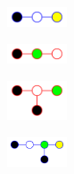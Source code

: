 \vspace{-10pt}
\begin{minipage}[t]{0.24\hsize}
	\centering
	\includegraphics[width=50pt]{graph/g03b.png} \\
	\n
\end{minipage}
\begin{minipage}[t]{0.24\hsize}
	\centering
	\includegraphics[width=50pt]{graph/g01r.png} \\
	\p
\end{minipage}
\begin{minipage}[t]{0.24\hsize}
	\centering
	\includegraphics[width=50pt]{graph/g06r.png} \\
	\p
\end{minipage}
\begin{minipage}[t]{0.24\hsize}
	\centering
	\includegraphics[width=50pt]{graph/g07b.png} \\
	\n
\end{minipage}
\\
\vspace{5pt}
